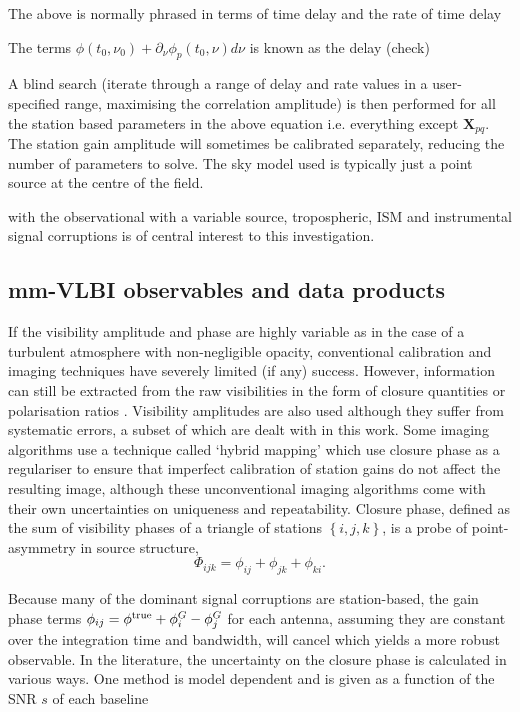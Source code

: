 The above is normally phrased in terms of time delay and the rate of time delay

The terms $\phi(t_0,\nu_0) +\partial_\nu \phi_p(t_0,\nu)d\nu$ is known as the delay (check)

A blind search (iterate through a range of delay and rate values in a user-specified range, maximising the correlation amplitude) is then performed for all the station based parameters in the above equation i.e. everything except $\bm X_{pq}$. The station gain amplitude will sometimes be calibrated separately, reducing the number of parameters to solve. The sky model used is typically just a point source at the centre of the field. 




with the observational  with a variable source, tropospheric, ISM and instrumental signal corruptions is of central interest to this investigation.



\subsection{mm-VLBI observables and data products}

If the visibility amplitude and phase are highly variable as in the case of a turbulent atmosphere with non-negligible opacity,  conventional calibration and imaging techniques have severely limited (if any) success. However, information can still be extracted from the raw visibilities in the form of closure quantities \citep{Monnier_2007} or polarisation ratios \citep{Fish_2009}. Visibility amplitudes are also used although they suffer from systematic errors, a subset of which are dealt with in this work. Some imaging algorithms use a technique called `hybrid mapping' \citep[e.g.][]{Lu_2014,Bouman_2015,Chael_2016} which use closure phase as a regulariser to ensure that imperfect calibration of station gains do not affect the resulting image, although these unconventional imaging algorithms come with their own uncertainties on uniqueness and repeatability. Closure phase, defined as the sum of visibility phases of a triangle of stations $\left\{i,j,k\right\}$, is a probe of point-asymmetry in source structure,
\begin{equation}
\Phi_{ijk} = \phi_{ij}+\phi_{jk}+\phi_{ki}.
\end{equation}

\noindent Because many of the dominant signal corruptions are station-based, the gain phase terms $\phi_{ij}=\phi^{\rm true}+ \phi^G_i -\phi^G_j$ for each antenna, assuming they are constant over the integration time and bandwidth, will cancel which yields a more robust observable.  
In the literature, the uncertainty on the closure phase is calculated in various ways. One method is model dependent \citep{Rogers_1995} and is given as a function of the SNR $s$ of each baseline 

